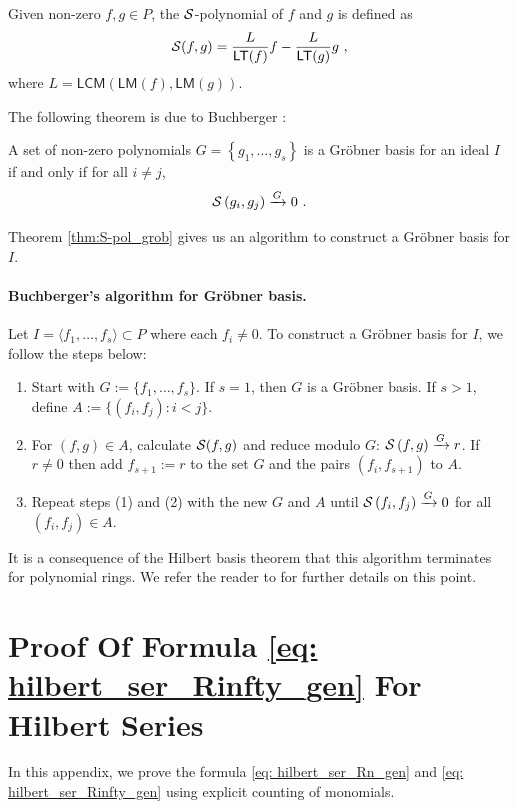 \documentclass[a4paper,10pt]{article}
\newcommand{\mr}[1]{\mathsf{#1}}
\def\CS {{\cal S}}
\begin{document}
\begin{appendix}
\begin{defn}
Given non-zero $f, g \in P$, the $\CS$-polynomial of $f$ and $g$ is defined as
\begin{equation}
\CS(f, g)=\frac{L}{\mathsf{LT}(f)} f-\frac{L}{\mathsf{LT}(g)} g~,
\end{equation}
where $L=\mr{LCM}(\mr{LM}(f), \mr{LM}(g))$.    
\end{defn}
The following theorem is due to Buchberger \cite{Buchberger1985}:
\begin{thm}\emph{\cite[Theorem 1.7.4]{loustaunau1994introduction}}\label{thm:S-pol_grob}
A set of non-zero polynomials $G=\left\{g_1, \ldots, g_s\right\}$ is a Gr\"{o}bner basis for an ideal $I$ if and only if for all $i \neq j$,
\begin{equation}
\CS\left(g_i, g_j\right) \xrightarrow{G} 0~ .
\end{equation}    
\end{thm}
Theorem \ref{thm:S-pol_grob} gives us an algorithm to construct a Gr\"{o}bner basis for $I$. 
\paragraph{Buchberger's algorithm for Gr\"{o}bner basis.} Let $I=\langle f_1,\dots,f_s\rangle\subset P$ where each $f_i\neq 0$. To construct a Gr\"{o}bner basis for $I$, we follow the steps below:
\begin{enumerate}[(1)]
    \item Start with $G:=\{f_1,\dots,f_s\}$. If $s=1$, then $G$ is a Gr\"{o}bner basis. If $s>1$, define $A:=\{(f_i,f_j):i<j\}$.
    \item  For $(f,g)\in A$, calculate $\CS(f,g)$ and reduce modulo $G$: $\CS\left(f, g\right) \xrightarrow{G} r$. If $r\neq 0$ then add $f_{s+1}:=r$ to the set $G$ and the pairs $(f_i,f_{s+1})$ to $A$.
    \item Repeat steps (1) and (2) with the new $G$ and $A$ until $\CS\left(f_i, f_j\right) \xrightarrow{G} 0$ for all $(f_i,f_j)\in A$.
\end{enumerate}
It is a consequence of the Hilbert basis theorem that this algorithm terminates for polynomial rings. We refer the reader to \cite{loustaunau1994introduction} for further details on this point.
\section{Proof Of Formula \eqref{eq: hilbert_ser_Rinfty_gen} For Hilbert Series}\label{app:Hilb_ser_count}
In this appendix, we prove the formula \eqref{eq: hilbert_ser_Rn_gen} and \eqref{eq: hilbert_ser_Rinfty_gen} using explicit counting of monomials.  


\end{appendix}
\end{document}
